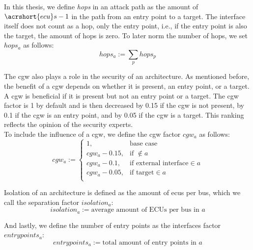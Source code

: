 \hfill \break

In this thesis, we define \textit{hops} in an attack path as the amount of \textit{$\acrshort{ecu}s - 1$} in the path from an entry point to a target.
The interface itself does not count as a hop, only the entry point, i.e., if the entry point is also the target, the amount of hops is zero.
To later norm the number of hops, we set $hops_{a}$ as follows:\\
\begin{equation}
    hops_{a} := \sum_{p} hops_{p} \label{eq:hops}
\end{equation}

\hfill \break

The \acrshort{cgw} also plays a role in the security of an architecture.
As mentioned before, the benefit of a \acrshort{cgw} depends on whether it is present, an entry point, or a target.
A \acrshort{cgw} is beneficial if it is present but not an entry point or a target.
The \acrshort{cgw} factor is 1 by default and is then decreased by 0.15 if the \acrshort{cgw} is not present,
by 0.1 if the \acrshort{cgw} is an entry point, and by 0.05 if the \acrshort{cgw} is a target.
This ranking reflects the opinion of the security experts.\\
To include the influence of a \acrshort{cgw}, we define the \acrshort{cgw} factor $cgw_{a}$ as follows:\\
\begin{equation}
    cgw_{a} := 
    \begin{cases}
    1,&\text{base case}\\
    cgw_{a} - 0.15,&\text{if } \not\in a\\
    cgw_{a} - 0.1,&\text{if external interface} \in a\\
    cgw_{a} - 0.05,&\text{if target} \in a\\
    \end{cases} \label{eq:cgw}
\end{equation}

\hfill \break

Isolation of an architecture is defined as the amount of \acrshort{ecu}s per bus, which we call the separation factor $isolation_{a}$:\\
\begin{equation}
    isolation_{a} := \text{average amount of ECUs per bus in } a \label{eq:isolation}
\end{equation}

\hfill \break

And lastly, we define the number of entry points as the interfaces factor $entrypoints_{a}$:\\
\begin{equation}
    entrypoints_{a} := \text{total amount of entry points in } a \label{eq:entrypoints}
\end{equation}

